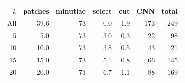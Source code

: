 \begin{tabular}{r rrrrrr}
\toprule
$k$ & patches & minutiae & select & cut & CNN & total \\
\midrule
All & 39.6 & 73 & 0.0 & 1.9 & 173 & 249 \\
5 & 5.0 & 73 & 3.0 & 0.3 & 22 & 98 \\
10 & 10.0 & 73 & 3.8 & 0.5 & 43 & 121 \\
15 & 15.0 & 73 & 5.1 & 0.8 & 66 & 145 \\
20 & 20.0 & 73 & 6.7 & 1.1 & 88 & 169 \\
\bottomrule
\end{tabular}
